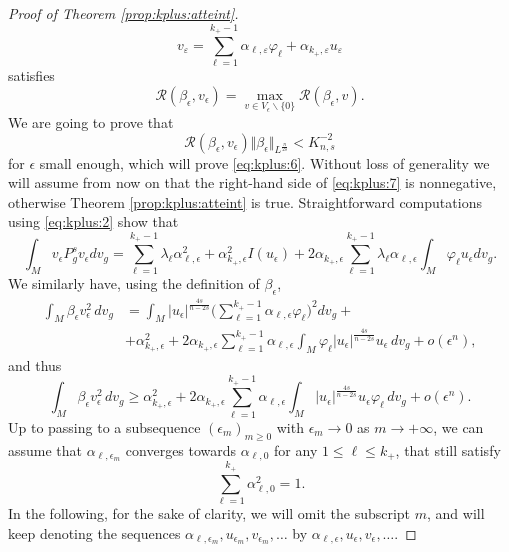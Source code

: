\documentclass[10pt]{amsart}
\numberwithin{equation}{section}
\def\ep{{\varepsilon}}
\newcommand{\ve}{\varepsilon}
\newcommand{\vp}{\varphi}
\def \rr {\mathbb{R}}
\def \ep{\epsilon}
\theoremstyle{plain}
\theoremstyle{remark}
\begin{document}
\begin{proof}[Proof of Theorem \ref{prop:kplus:atteint}]
 \begin{equation*} %
 	v_\ve=\sum_{\ell=1}^{k_+-1}\alpha_{\ell,\ve} \varphi_{\ell}+\alpha_{k_+,\ve}u_{\ve}
 \end{equation*}
satisfies
 \begin{equation}\label{eq:kplus:7}
 	\mathcal{R}(\beta_\ep, v_\ep) = \max_{v \in V_\ep \backslash \{0\}} \mathcal{R}(\beta_\ep, v). 
	\end{equation}
We are going to prove that 
 \begin{equation}\label{eq:kplus:71}
 	\mathcal{R}(\beta_\ep, v_\ep)  \Vert \beta_\ep \Vert_{L^{\frac{n}{2s}}} < K_{n,s}^{-2}%
	\end{equation}
for $\ep$ small enough, which will prove \eqref{eq:kplus:6}. Without loss of generality we will assume from now on that the right-hand side of \eqref{eq:kplus:7} is nonnegative, otherwise Theorem \ref{prop:kplus:atteint} is true. 
Straightforward computations using \eqref{eq:kplus:2} show that
\begin{equation} \label{test:est1}
  \int_{M} v_\ep P_g^s v_\ep dv_g = \sum_{\ell=1}^{k_+-1} \lambda_\ell \alpha_{\ell,\ep}^2+ \alpha_{k_+, \ep}^2 I(u_\ep) 
+  2 \alpha_{k_+,\ep}\sum_{\ell=1}^{k_+-1} \lambda_\ell \alpha_{\ell,\ep} \int_{M} \vp_\ell u_\ep dv_g.
\end{equation}
We similarly have, using the definition of $\beta_\ep$,
\begin{equation} \label{test:est2:1.5}
\begin{aligned}
	\int_{M} \beta_\ep v_{\ep}^2\, dv_g & =  \int_{M} |u_\ep|^{\frac{4s}{n-2s}} \big( \sum_{\ell=1}^{k_+-1} \alpha_{\ell,\ep} \vp_\ell \big)^2dv_g  + \\
	&+ \alpha_{k_+, \ep}^2 + 2\alpha_{k_+,\ep}\sum_{\ell=1}^{k_+-1}\alpha_{\ell,\ep} \int_{M} \varphi_{\ell}|u_{\ep}|^{\frac{4s}{n-2s}} u_\ep\, dv_g + o(\ep^n),
	\end{aligned}
	\end{equation} 
	and thus 
	\begin{equation} \label{test:est2:2}
	\int_{M} \beta_\ep v_{\ep}^2\, dv_g
	 \ge  \alpha_{k_+, \ep}^2 + 2\alpha_{k_+,\ep}\sum_{\ell=1}^{k_+-1}\alpha_{\ell,\ep} \int_{M} |u_{\ep}|^{\frac{4s}{n-2s}} u_\ep \varphi_{\ell}\, dv_g + o(\ep^n). 
\end{equation}
Up to passing to a subsequence $(\ep_m)_{m\ge 0}$ with $\ep_m \to 0$ as $m \to + \infty$, we can assume that $\alpha_{\ell,\ep_m}$ converges towards $\alpha_{\ell,0}$ for any $1 \le \ell \le k_+$, that still satisfy 
$$\sum_{\ell=1}^{k_+} \alpha_{\ell,0}^2 = 1.$$ 
In the following, for the sake of clarity, we will omit the subscript $m$, and will keep denoting the sequences $\alpha_{\ell,\ep_m}, u_{\ep_m}, v_{\ep_m}, \dots$ by $\alpha_{\ell,\ep}, u_\ep, v_\ep, \dots$. %


\end{proof}
\end{document}
